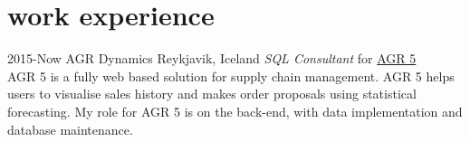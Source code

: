 \documentclass[]{cv} %
\begin{document}
\section{work experience}


\begin{entrylist}
\entry
{2015-Now}
{AGR Dynamics}
{Reykjavik, Iceland}
{\emph{SQL Consultant} for
    \href{http://agrdynamics.com/}{AGR 5}\\
    AGR 5 is a fully web based solution for supply chain management. AGR 5 
    helps users to visualise sales history and makes order proposals using 
    statistical forecasting. My role for AGR 5 is on the back-end, with data 
    implementation and database maintenance.
}    
\end{entrylist}
\end{document}
